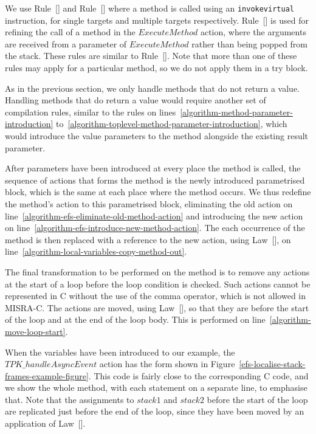 We use
Rule~[] and
Rule~[]
where a method is called using an \texttt{invokevirtual} instruction,
for single targets and multiple targets respectively.
Rule~[] is used
for refining the call of a method in the $ExecuteMethod$ action, where
the arguments are received from a parameter of $ExecuteMethod$ rather
than being popped from the stack.
These rules are similar to
Rule~[].
Note that more than one of these rules may apply for a particular
method, so we do not apply them in a try block.

As in the previous section, we only handle methods that do not return
a value.
Handling methods that do return a value would require another set of
compilation rules, similar to the rules on
lines~\ref{algorithm-method-parameter-introduction}
to~\ref{algorithm-toplevel-method-parameter-introduction}, which would
introduce the value parameters to the method alongside the existing
result parameter.

After parameters have been introduced at every place the method is
called, the sequence of actions that forms the method is the newly
introduced parametrised block, which is the same at each place where
the method occurs.
We thus redefine the method's action to this parametrised block,
eliminating the old action on
line~\ref{algorithm-efs-eliminate-old-method-action} and introducing
the new action on
line~\ref{algorithm-efs-introduce-new-method-action}.
The each occurrence of the method is then replaced with a reference to
the new action, using Law~[], on
line~\ref{algorithm-local-variables-copy-method-out}.

The final transformation to be performed on the method is to remove
any actions at the start of a loop before the loop condition is
checked.
Such actions cannot be represented in C without the use of the comma
operator, which is not allowed in MISRA-C.
The actions are moved, using Law~[], so
that they are before the start of the loop and at the end of the loop
body.
This is performed on line~\ref{algorithm-move-loop-start}.

When the variables have been introduced to our example, the
$TPK\_handleAsyncEvent$ action has the form shown in
Figure~\ref{efs-localise-stack-frames-example-figure}.
This code is fairly close to the corresponding C code, and we show the
whole method, with each statement on a separate line, to emphasise
that.
Note that the assignments to $stack1$ and $stack2$ before the start of
the loop are replicated just before the end of the loop, since they
have been moved by an application of
Law~[].

